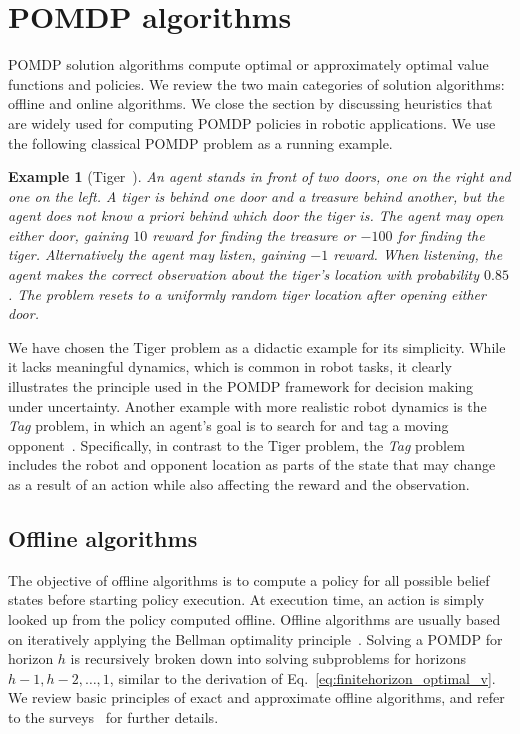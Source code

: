\documentclass[journal]{IEEEtran}
\newtheorem*{example*}{Example}
\begin{document}
\section{POMDP  algorithms}
\label{sec:solvers}
POMDP solution algorithms compute optimal or {approximately optimal} value
functions and policies.  We review the two main categories of solution
algorithms: offline and online algorithms.  We close the section by
discussing heuristics that are widely used for computing POMDP
policies in {robotic applications}.
We use the following
classical POMDP problem as a running example.
\begin{example*}[Tiger~\cite{cassandra1994acting}]
An agent stands in front of two doors, one on the right and one on the left.
A tiger is behind one door and a treasure behind another, but
the agent does not know a priori behind which door the tiger is. The
agent may open either door, gaining {$10$ reward} for finding the
treasure or $-100$ for finding the tiger. Alternatively the agent may
listen, gaining $-1$ reward. When listening, the agent makes the
correct observation about the tiger's location with probability
$0.85$. The problem resets to a uniformly random tiger location after
opening either door.
\end{example*}
We have chosen the Tiger problem  as a didactic example for its simplicity. While it lacks meaningful dynamics, which is common in robot tasks, it clearly illustrates the  principle used in the  POMDP framework for decision making under uncertainty.
Another example  with more realistic robot dynamics is the \emph{Tag} problem, in which an agent's goal is to search for and tag a moving opponent~\cite{pineau2003point}.
{Specifically, in contrast to the Tiger problem, the \emph{Tag} problem includes the robot and opponent location as parts of the state that may change as a result of an action while also affecting the reward and the observation.}

\subsection{Offline algorithms}
\label{subsec:offline_algorithms}
The objective of offline algorithms is to compute a policy for all
possible belief states before starting policy execution.  At execution time,
an action is simply looked up from the policy computed
offline.  Offline algorithms are usually based on {iteratively applying} the Bellman optimality principle~\cite{astrom1965optimal,bellman1966dynamic}. Solving a
POMDP for horizon $h$ is recursively broken down into solving
subproblems for horizons $h-1, h-2, \ldots, 1$, similar to the
derivation of Eq.~\eqref{eq:finitehorizon_optimal_v}.  We review basic
principles of exact and approximate offline algorithms, and refer to
the
surveys~\cite{monahan1982state,white1991survey,lovejoy1991survey,hauskrecht2000value,shani2013survey}
for further details.
\end{document}
